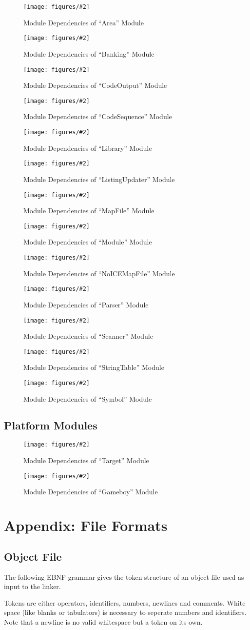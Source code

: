 \documentclass[10pt]{article}
\newcommand{\centeredExternalPicture}[2][]{%
  \begin{center}
    \texttt{[image: figures/\#2]}%
  \end{center}
}
\newcommand{\dependencyFigure}[3]{%
  \generalDependencyFigure{#1}{figure:module_dependency_#2}%
                              {Module Dependencies of ``#3'' Module}
}
\newcommand{\generalDependencyFigure}[3]{%
  \begin{figure}[th]
    \centeredExternalPicture[width=\textwidth]{linkerFigures-#1.mps}
    \caption{#3}
    \label{#2}
  \end{figure}
}
\begin{document}
\dependencyFigure{4}{area}{Area}

\dependencyFigure{5}{banking}{Banking}

\dependencyFigure{6}{codeoutput}{CodeOutput}

\dependencyFigure{7}{codesequence}{CodeSequence}

\dependencyFigure{8}{library}{Library}

\dependencyFigure{9}{listingupdater}{ListingUpdater}

\dependencyFigure{10}{mapfile}{MapFile}

\dependencyFigure{11}{module}{Module}

\dependencyFigure{12}{noicemapfile}{NoICEMapFile}

\dependencyFigure{13}{parser}{Parser}

\dependencyFigure{14}{scanner}{Scanner}

\dependencyFigure{15}{stringtable}{StringTable}

\dependencyFigure{16}{symbol}{Symbol}


\subsection{Platform Modules}

\dependencyFigure{17}{target}{Target}

\dependencyFigure{18}{gameboy}{Gameboy}



\section{Appendix: File Formats}

\subsection{Object File}

The following EBNF-grammar gives the token structure of an object file
used as input to the linker.

Tokens are either operators, identifiers, numbers, newlines and
comments.  White space (like blanks or tabulators) is necessary to
seperate numbers and identifiers.  Note that a newline is no valid
whitespace but a token on its own.
\end{document}
